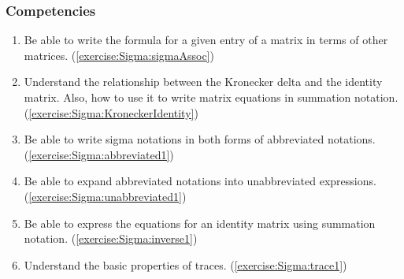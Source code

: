 \subsubsection*{Competencies}
\begin{enumerate}
\item
Be able to write the formula for a given entry of a matrix in terms of other matrices. (\ref{exercise:Sigma:sigmaAssoc})
\item
Understand the relationship between the Kronecker delta and the identity matrix. Also, how to use it to write matrix equations in summation notation. (\ref{exercise:Sigma:KroneckerIdentity})
\item
Be able to write sigma notations in both forms of abbreviated notations. (\ref{exercise:Sigma:abbreviated1})
\item
Be able to expand abbreviated notations into unabbreviated expressions. (\ref{exercise:Sigma:unabbreviated1})
\item
Be able to express the equations for an identity matrix using summation notation. (\ref{exercise:Sigma:inverse1})
\item
Understand the basic properties of traces. (\ref{exercise:Sigma:trace1})
\end{enumerate}